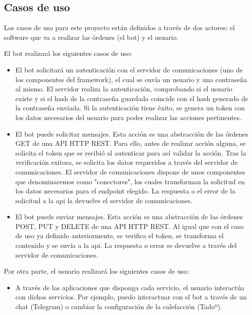 \documentclass[spanish,12pt, a4paper, twoside]{paper}
\begin{document}
\subsection{Casos de uso}

Los casos de uso para este proyecto están definidos a través de dos actores: el software que va a realizar las órdenes (el bot) y el usuario.

El bot realizará los siguientes casos de uso:

\begin{itemize}
\item El bot solicitará un autenticación con el servidor de comunicaciones (uno de los componentes del framework), el cual se envía un usuario y una contraseña al mismo. El servidor realiza la autenticación, comprobando si el usuario existe y si el hash de la contraseña guardada coincide con el hash generado de la contraseña enviada. Si la autenticación tiene éxito, se genera un token con los datos necesarios del usuario para poder realizar las acciones pertinentes.

\item El bot puede solicitar mensajes. Esta acción es una abstracción de las órdenes GET de una API HTTP REST. Para ello, antes de realizar acción alguna, se solicita el token que se recibió al autenticar para así validar la acción. Tras la verificación exitosa, se solicita los datos requeridos a través del servidor de comunicaciones. El servidor de comunicaciones dispone de unos componentes que denominaremos como "conectores", los cuales transforman la solicitud en los datos necesarios para el endpoint elegido. La respuesta o el error de la solicitud a la api la devuelve el servidor de comunicaciones.

\item El bot puede enviar mensajes. Esta acción es una abstracción de las órdenes POST, PUT y DELETE de una API HTTP REST. Al igual que con el caso de uso ya definido anteriormente, se verifica el token, se transforma el contenido y se envía a la api. La respuesta o error se devuelve a través del servidor de comunicaciones.
\end{itemize}

Por otra parte, el usuario realizará los siguientes casos de uso:

\begin{itemize}
\item A través de las aplicaciones que disponga cada servicio, el usuario interactúa con dichos servicios. Por ejemplo, puedo interactuar con el bot a través de un chat (Telegram) o cambiar la configuración de la calefacción (Tadoº).
\end{itemize}
\end{document}
